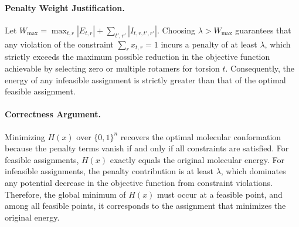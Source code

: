 \documentclass[12pt]{article}
\begin{document}
\paragraph{Penalty Weight Justification.}
Let $W_{\max} = \max_{t,r} |E_{t,r}| + \sum_{t', r'} |I_{t,r,t',r'}|$. Choosing $\lambda > W_{\max}$ guarantees that any violation of the constraint $\sum_r x_{t,r} = 1$ incurs a penalty of at least $\lambda$, which strictly exceeds the maximum possible reduction in the objective function achievable by selecting zero or multiple rotamers for torsion $t$. Consequently, the energy of any infeasible assignment is strictly greater than that of the optimal feasible assignment.

\paragraph{Correctness Argument.}
Minimizing $H(x)$ over $\{0,1\}^n$ recovers the optimal molecular conformation because the penalty terms vanish if and only if all constraints are satisfied. For feasible assignments, $H(x)$ exactly equals the original molecular energy. For infeasible assignments, the penalty contribution is at least $\lambda$, which dominates any potential decrease in the objective function from constraint violations. Therefore, the global minimum of $H(x)$ must occur at a feasible point, and among all feasible points, it corresponds to the assignment that minimizes the original energy.
\end{document}
